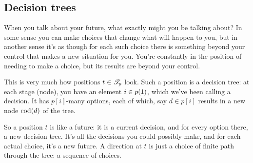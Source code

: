 \documentclass[Book-Poly]{subfiles}
\begin{document}


\subsection{Decision trees}

When you talk about your future, what exactly might you be talking about? In some sense you can make choices that change what will happen to you, but in another sense it's as though for each such choice there is something beyond your control that makes a new situation for you. You're constantly in the position of needing to make a choice, but its results are beyond your control.

This is very much how positions $t\in\mathscr{T}_{p}$ look. Such a position is a decision tree: at each stage (node), you have an element $i\in p(\textsf{1})$, which we've been calling a decision. It has $p[i]$-many options, each of which, say $d\in p[i]$ results in a new node $\operatorname{cod}(d)$ of the tree.

So a position $t$ is like a future: it is a current decision, and for every option there, a new decision tree. It's all the decisions you could possibly make, and for each actual choice, it's a new future. A direction at $t$ is just a choice of finite path through the tree: a sequence of choices. 
\end{document}
